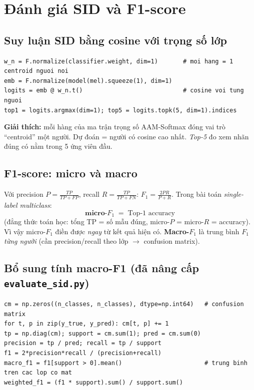 \documentclass[12pt,a4paper]{article}
\begin{document}
\section{Đánh giá SID và F1-score}
\subsection{Suy luận SID bằng cosine với trọng số lớp}
\begin{lstlisting}
w_n = F.normalize(classifier.weight, dim=1)       # moi hang = 1 centroid nguoi noi
emb = F.normalize(model(mel).squeeze(1), dim=1)
logits = emb @ w_n.t()                            # cosine voi tung nguoi
top1 = logits.argmax(dim=1); top5 = logits.topk(5, dim=1).indices
\end{lstlisting}
\textbf{Giải thích:} mỗi hàng của ma trận trọng số AAM-Softmax đóng vai trò
``centroid'' một người. Dự đoán = người có cosine cao nhất. \emph{Top-5} đo xem
nhãn đúng có nằm trong 5 ứng viên đầu.

\subsection{F1-score: micro và macro}
Với precision $P=\tfrac{TP}{TP+FP}$, recall $R=\tfrac{TP}{TP+FN}$:
$F_1=\tfrac{2PR}{P+R}$. Trong bài toán \emph{single-label multiclass}:
\[
\textbf{micro-}F_1 \;=\; \text{Top-1 accuracy}
\]
(đẳng thức toán học: tổng TP = số mẫu đúng, micro-$P$ = micro-$R$ = accuracy). Vì
vậy micro-$F_1$ điền được \emph{ngay} từ kết quả hiện có. \textbf{Macro-}$F_1$ là
trung bình $F_1$ \emph{từng người} (cần precision/recall theo lớp $\to$ confusion
matrix).

\subsection{Bổ sung tính macro-F1 (đã nâng cấp \texttt{evaluate\_sid.py})}
\begin{lstlisting}
cm = np.zeros((n_classes, n_classes), dtype=np.int64)   # confusion matrix
for t, p in zip(y_true, y_pred): cm[t, p] += 1
tp = np.diag(cm); support = cm.sum(1); pred = cm.sum(0)
precision = tp / pred; recall = tp / support
f1 = 2*precision*recall / (precision+recall)
macro_f1 = f1[support > 0].mean()                       # trung binh tren cac lop co mat
weighted_f1 = (f1 * support).sum() / support.sum()
\end{lstlisting}
\end{document}
